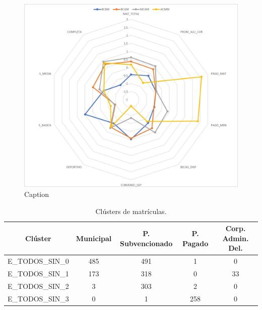 \begin{figure}[H]
    \centering
    \includegraphics[width=\textwidth]{images/radar_chart_establecimientos_sin.jpg}
    \caption{Caption}
    \label{fig:my_label}
\end{figure}


\begin{table}[H]
\centering
\caption{Clústers de matrículas.}
\label{tab:cl_dependencia_sin}
\begin{tabular}{|c|c|c|c|c|}
\hline
\textbf{Clúster} & \textbf{Municipal} & \textbf{P. Subvencionado} & \textbf{P. Pagado} & \textbf{Corp. Admin. Del.}   \\ \hline
E\_TODOS\_SIN\_0 & 485 & 491 & 1 & 0 \\ \hline
E\_TODOS\_SIN\_1 & 173 & 318 & 0 & 33 \\ \hline
E\_TODOS\_SIN\_2 & 3 & 303 & 2 & 0 \\ \hline
E\_TODOS\_SIN\_3 & 0 & 1 & 258 & 0 \\ \hline
\end{tabular}
\end{table}

